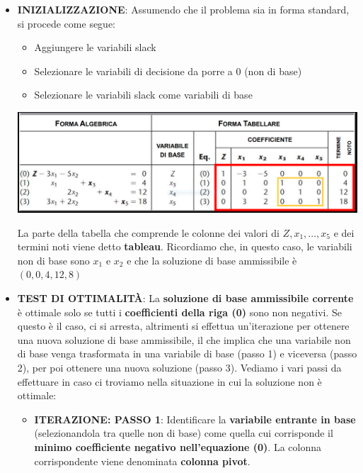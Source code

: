 \documentclass[12pt]{article}
\begin{document}
\begin{itemize}
    \item \textbf{INIZIALIZZAZIONE}: Assumendo che il problema sia in forma standard, si procede come segue:
    \begin{itemize}
        \item Aggiungere le variabili slack
        \item Selezionare le variabili di decisione da porre a 0 (non di base)
        \item Selezionare le variabili slack come variabili di base
    \end{itemize}
    \begin{center}
        \vspace{-0.3cm}
        \includegraphics[width = 1\linewidth]{Images/29.PNG}
        \vspace{-1cm}
    \end{center}
    La parte della tabella che comprende le colonne dei valori di $Z, x_1, ..., x_5$ e dei termini noti viene detto \textbf{tableau}.
    Ricordiamo che, in questo caso, le variabili non di base sono $x_1$ e $x_2$ e che la soluzione di base ammissibile è $(0, 0, 4, 12, 8)$
    \item \textbf{TEST DI OTTIMALITÀ}: La \textbf{soluzione di base ammissibile corrente} è ottimale solo se tutti i \textbf{coefficienti della riga (0)} sono non negativi.
    Se questo è il caso, ci si arresta, altrimenti si effettua un'iterazione per ottenere una nuova soluzione di base ammissibile, il che implica che una variabile non di base venga trasformata in una variabile di base (passo 1)
    e viceversa (passo 2), per poi ottenere una nuova soluzione (passo 3).
    Vediamo i vari passi da effettuare in caso ci troviamo nella situazione in cui la soluzione non è ottimale:
    \begin{itemize}
        \item \textbf{ITERAZIONE: PASSO 1}: Identificare la \textbf{variabile entrante in base} (selezionandola tra quelle non di base) come quella cui corrisponde il \textbf{minimo coefficiente negativo nell'equazione (0)}.
        La colonna corrispondente viene denominata \textbf{colonna pivot}.

\end{itemize}
\end{itemize}
\end{document}
